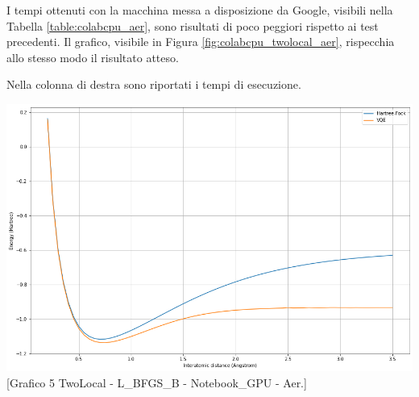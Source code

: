 I tempi ottenuti con la macchina messa a disposizione da Google, visibili nella Tabella \ref{table:colabcpu_aer}, sono risultati di poco peggiori rispetto ai test precedenti.
Il grafico, visibile in Figura \ref{fig:colabcpu_twolocal_aer}, rispecchia allo stesso modo il risultato atteso.
\newline\newline
\begin{minipage}[b]{0.39\textwidth}
    \captionsetup{type=table}
    \caption[Risultati quarta simulazione.]{Nella colonna di destra sono riportati i tempi di esecuzione.}
    \label{table:notebookgpu_aer}
\end{minipage}
\hfill
\begin{minipage}[b]{0.57\textwidth}
    \centering
    \includegraphics[width=1.0\textwidth]{Images/Capitolo3/Plots/H2_twolocal_ry_rz_cz_aer_gpu_plot.png}
    [Grafico 5 \newline TwoLocal - L\_BFGS\_B - Notebook\_GPU - Aer.]{}
    \label{fig:notebookgpu_twolocal_aer}
\end{minipage}
